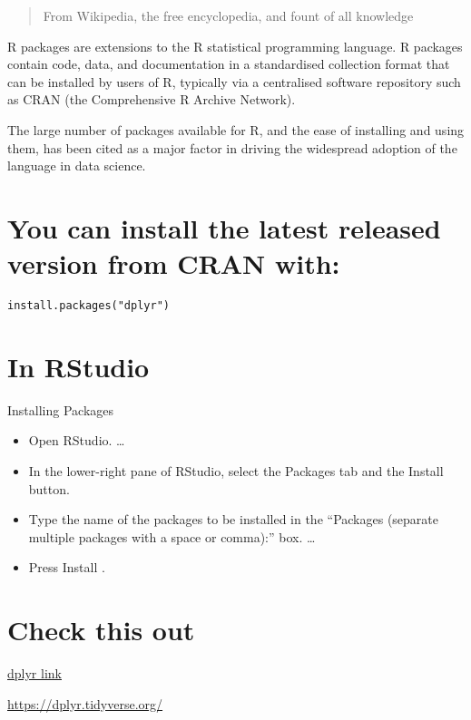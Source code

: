 \documentclass[
]{book}
\providecommand{\tightlist}{%
  \setlength{\itemsep}{0pt}\setlength{\parskip}{0pt}}
\begin{document}
\begin{quote}
From Wikipedia, the free encyclopedia, and fount of all knowledge
\end{quote}

R packages are extensions to the R statistical programming language. R packages contain code, data, and documentation in a standardised collection format that can be installed by users of R, typically via a centralised software repository such as CRAN (the Comprehensive R Archive Network).

The large number of packages available for R, and the ease of installing and using them, has been cited as a major factor in driving the widespread adoption of the language in data science.

\hypertarget{you-can-install-the-latest-released-version-from-cran-with}{%
\section{You can install the latest released version from CRAN with:}\label{you-can-install-the-latest-released-version-from-cran-with}}

\texttt{install.packages("dplyr")}

\hypertarget{in-rstudio}{%
\section{In RStudio}\label{in-rstudio}}

Installing Packages

\begin{itemize}
\tightlist
\item
  Open RStudio. \ldots{}
\item
  In the lower-right pane of RStudio, select the Packages tab and the Install button.
\item
  Type the name of the packages to be installed in the ``Packages (separate multiple packages with a space or comma):'' box. \ldots{}
\item
  Press Install .
\end{itemize}

\hypertarget{check-this-out}{%
\section{Check this out}\label{check-this-out}}

\href{https://dplyr.tidyverse.org/}{dplyr link}

\url{https://dplyr.tidyverse.org/}
\end{document}
